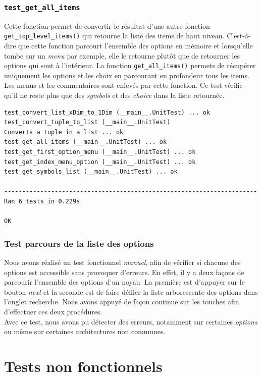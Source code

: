 \documentclass[17pts]{report}
\begin{document}
\subsubsection{\texttt{test\_get\_all\_items}}
\label{ssub:TestGetAllItems}
Cette fonction permet de convertir le résultat d'une autre fonction
\verb|get_top_level_items()| qui retourne la liste des items de haut niveau.
C'est-à-dire que cette fonction parcourt l'ensemble des options en mémoire et
lorsqu'elle tombe sur un \textit{menu} par exemple, elle le retourne plutôt que
de retourner les options qui sont à l'intérieur. La fonction
\verb|get_all_items()| permets de récupérer uniquement les options et les choix
en parcourant en profondeur tous les items. Les menus et les commentaires sont
enlevés par cette fonction. Ce test vérifie qu'il ne reste plus que des
\textit{symbols} et des \textit{choice} dans la liste retournée.

\begin{verbatim}
test_convert_list_xDim_to_1Dim (__main__.UnitTest) ... ok
test_convert_tuple_to_list (__main__.UnitTest)
Converts a tuple in a list ... ok
test_get_all_items (__main__.UnitTest) ... ok
test_get_first_option_menu (__main__.UnitTest) ... ok
test_get_index_menu_option (__main__.UnitTest) ... ok
test_get_symbols_list (__main__.UnitTest) ... ok

----------------------------------------------------------------------
Ran 6 tests in 0.229s

OK
\end{verbatim}


\subsubsection{Test parcours de la liste des options}
\label{ssub:Test parcours de la liste des options}

Nous avons réalisé un test fonctionnel \textit{manuel}, afin de vérifier si
chacune des options est accessible sans provoquer d'erreurs. En effet, il y
a deux façons de parcourir l'ensemble des options d'un noyau.
La première est d'appuyer sur le bouton \textit{next} et la seconde est de
faire défiler la liste arborescente des options dans l'onglet recherche.
Nous avons appuyé de façon continue sur les touches afin d'effectuer ces deux
procédures.\\
Avec ce test, nous avons pu détecter des erreurs, notamment sur certaines
\textit{options} ou même sur certaines architectures non communes.

\section{Tests non fonctionnels}
\label{sec:Tests non fonctionnels}
\end{document}
